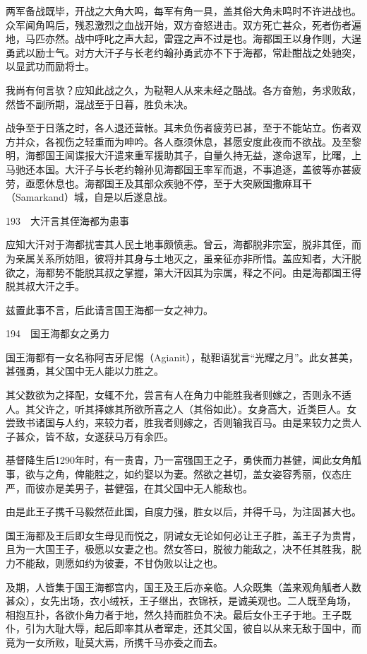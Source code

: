 \documentclass[12pt,UTF8]{ctexbook}
\begin{document}
两军备战既毕，开战之大角大鸣，每军有角一具，盖其俗大角未鸣时不许进战也。众军闻角鸣后，残忍激烈之血战开始，双方奋怒进击。双方死亡甚众，死者伤者遍地，马匹亦然。战中呼叱之声大起，雷霆之声不过是也。海都国王以身作则，大逞勇武以励士气。对方大汗子与长老约翰孙勇武亦不下于海都，常赴酣战之处驰突，以显武功而励将士。

我尚有何言欤？应知此战之久，为鞑靼人从来未经之酷战。各方奋勉，务求败敌，然皆不副所期，混战至于日暮，胜负未决。

战争至于日落之时，各人退还营帐。其未负伤者疲劳已甚，至于不能站立。伤者双方并众，各视伤之轻重而为呻吟。各人亟须休息，甚愿安度此夜而不欲战。及至黎明，海都国王闻谍报大汗遣来重军援助其子，自量久持无益，遂命退军，比曙，上马驰还本国。大汗子与长老约翰孙见海都国王率军而退，不事追逐，盖彼等亦甚疲劳，亟愿休息也。海都国王及其部众疾驰不停，至于大突厥国撒麻耳干（Samarkand）城，自是以后遂息战。





193　大汗言其侄海都为患事

应知大汗对于海都扰害其人民土地事颇愤恚。曾云，海都脱非宗室，脱非其侄，而为亲属关系所妨阻，彼将并其身与土地灭之，虽亲征亦非所惜。盖应知者，大汗脱欲之，海都势不能脱其叔之掌握，第大汗因其为宗属，释之不问。由是海都国王得脱其叔大汗之手。

兹置此事不言，后此请言国王海都一女之神力。





194　国王海都女之勇力

国王海都有一女名称阿吉牙尼惕（Agianit），鞑靼语犹言“光耀之月”。此女甚美，甚强勇，其父国中无人能以力胜之。

其父数欲为之择配，女辄不允，尝言有人在角力中能胜我者则嫁之，否则永不适人。其父许之，听其择嫁其所欲所喜之人（其俗如此）。女身高大，近类巨人。女尝致书诸国与人约，来较力者，胜我者则嫁之，否则输我百马。由是来较力之贵人子甚众，皆不敌，女遂获马万有余匹。

基督降生后1290年时，有一贵胄，乃一富强国王之子，勇侠而力甚健，闻此女角觚事，欲与之角，俾能胜之，如约娶以为妻。然欲之甚切，盖女姿容秀丽，仪态庄严，而彼亦是美男子，甚健强，在其父国中无人能敌也。

由是此王子携千马毅然莅此国，自度力强，胜女以后，并得千马，为注固甚大也。

国王海都及王后即女生母见而悦之，阴诫女无论如何必让王子胜，盖王子为贵胄，且为一大国王子，极愿以女妻之也。然女答曰，脱彼力能敌之，决不任其胜我，脱力不能敌，则愿如约为彼妻，不甘伪败以让之也。

及期，人皆集于国王海都宫内，国王及王后亦亲临。人众既集（盖来观角觚者人数甚众），女先出场，衣小绒袄，王子继出，衣锦袄，是诚美观也。二人既至角场，相抱互扑，各欲仆角力者于地，然久持而胜负不决。最后女仆王子于地。王子既仆，引为大耻大辱，起后即率其从者窜走，还其父国，彼自以从来无敌于国中，而竟为一女所败，耻莫大焉，所携千马亦委之而去。
\end{document}
